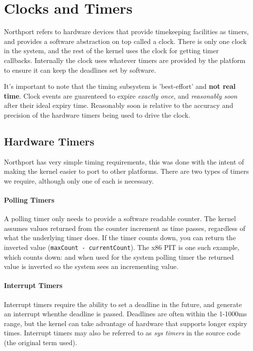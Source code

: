 \section{Clocks and Timers}
Northport refers to hardware devices that provide timekeeping facilities as timers, and provides a software abstraction on top called a clock. There is only one clock in the system, and the rest of the kernel uses the clock for getting timer callbacks. Internally the clock uses whatever timers are provided by the platform to ensure it can keep the deadlines set by software.

It's important to note that the timing subsystem is 'best-effort' and \textbf{not real time}. Clock events are guarenteed to expire \textit{exactly once}, and \textit{reasonably soon} after their ideal expiry time. Reasonably soon is relative to the accuracy and precision of the hardware timers being used to drive the clock.

\subsection{Hardware Timers}
Northport has very simple timing requirements, this was done with the intent of making the kernel easier to port to other platforms. There are two types of timers we require, although only one of each is necessary.

\paragraph{Polling Timers}
A polling timer only needs to provide a software readable counter. The kernel assumes values returned from the counter increment as time passes, regardless of what the underlying timer does. If the timer counts down, you can return the inverted value (\verb|maxCount - currentCount|). The x86 PIT is one such example, which counts down: and when used for the system polling timer the returned value is inverted so the system sees an incrementing value.

\paragraph{Interrupt Timers}
Interrupt timers require the ability to set a deadline in the future, and generate an interrupt whenthe deadline is passed. Deadlines are often within the 1-1000ms range, but the kernel can take advantage of hardware that supports longer expiry times. Interrupt timers may also be referred to as \textit{sys timers} in the source code (the original term used).

